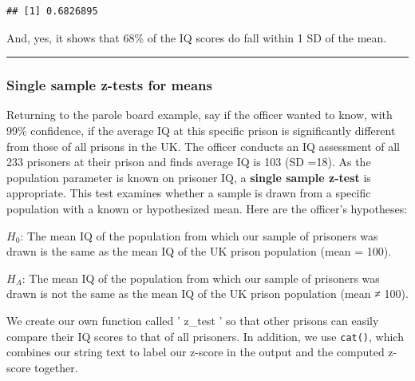 \documentclass[
]{book}
\begin{document}
\begin{verbatim}
## [1] 0.6826895
\end{verbatim}

And, yes, it shows that 68\% of the IQ scores do fall within 1 SD of the mean.

\begin{center}\rule{0.5\linewidth}{0.5pt}\end{center}

\hypertarget{single-sample-z-tests-for-means}{%
\subsubsection{\texorpdfstring{\textbf{Single sample z-tests for means}}{Single sample z-tests for means}}\label{single-sample-z-tests-for-means}}

Returning to the parole board example, say if the officer wanted to know, with 99\% confidence, if the average IQ at this specific prison is significantly different from those of all prisons in the UK. The officer conducts an IQ assessment of all 233 prisoners at their prison and finds average IQ is 103 (SD =18). As the population parameter is known on prisoner IQ, a \textbf{single sample z-test} is appropriate. This test examines whether a sample is drawn from a specific population with a known or hypothesized mean. Here are the officer's hypotheses:

\(H_0\): The mean IQ of the population from which our sample of prisoners was drawn is the same as the mean IQ of the UK prison population (mean = 100).

\(H_A\): The mean IQ of the population from which our sample of prisoners was drawn is not the same as the mean IQ of the UK prison population (mean ≠ 100).

We create our own function called ' z\_test ' so that other prisons can easily compare their IQ scores to that of all prisoners. In addition, we use \texttt{cat()}, which combines our string text to label our z-score in the output and the computed z-score together.
\end{document}

